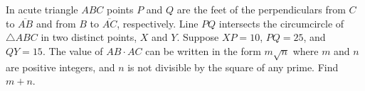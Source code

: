 In acute triangle $ABC$ points $P$ and $Q$ are the feet of the perpendiculars from $C$ to $\overline{AB}$ and from $B$ to $\overline{AC}$, respectively.  Line $PQ$ intersects the circumcircle of $\triangle ABC$ in two distinct points, $X$ and $Y$.  Suppose $XP=10$, $PQ=25$, and $QY=15$.  The value of $AB\cdot AC$ can be written in the form $m\sqrt n$ where $m$ and $n$ are positive integers, and $n$ is not divisible by the square of any prime. Find $m+n$.